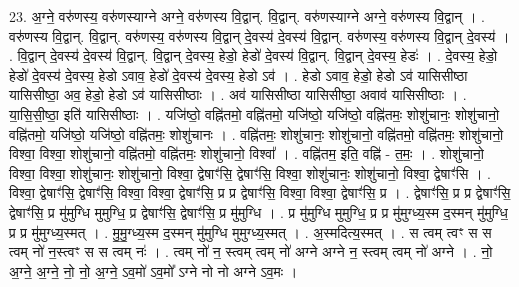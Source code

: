 \documentclass[17pt]{extarticle}
\begin{document}
23. अ॒ग्ने॒ वरु॑णस्य॒ वरु॑णस्याग्ने अग्ने॒ वरु॑णस्य वि॒द्वान्. वि॒द्वान्. वरु॑णस्याग्ने अग्ने॒ वरु॑णस्य वि॒द्वान् । . वरु॑णस्य वि॒द्वान्. वि॒द्वान्. वरु॑णस्य॒ वरु॑णस्य वि॒द्वान् दे॒वस्य॑ दे॒वस्य॑ वि॒द्वान्. वरु॑णस्य॒ वरु॑णस्य वि॒द्वान् दे॒वस्य॑ । . वि॒द्वान् दे॒वस्य॑ दे॒वस्य॑ वि॒द्वान्. वि॒द्वान् दे॒वस्य॒ हेडो॒ हेडो॑ दे॒वस्य॑ वि॒द्वान्. वि॒द्वान् दे॒वस्य॒ हेडः॑ । . दे॒वस्य॒ हेडो॒ हेडो॑ दे॒वस्य॑ दे॒वस्य॒ हेडो ऽवाव॒ हेडो॑ दे॒वस्य॑ दे॒वस्य॒ हेडो ऽव॑ । . हेडो ऽवाव॒ हेडो॒ हेडो ऽव॑ यासिसीष्ठा यासिसीष्ठा॒ अव॒ हेडो॒ हेडो ऽव॑ यासिसीष्ठाः । . अव॑ यासिसीष्ठा यासिसीष्ठा॒ अवाव॑ यासिसीष्ठाः । . या॒सि॒सी॒ष्ठा॒ इति॑ यासिसीष्ठाः । . यजि॑ष्ठो॒ वह्नि॑तमो॒ वह्नि॑तमो॒ यजि॑ष्ठो॒ यजि॑ष्ठो॒ वह्नि॑तमः॒ शोशु॑चानः॒ शोशु॑चानो॒ वह्नि॑तमो॒ यजि॑ष्ठो॒ यजि॑ष्ठो॒ वह्नि॑तमः॒ शोशु॑चानः । . वह्नि॑तमः॒ शोशु॑चानः॒ शोशु॑चानो॒ वह्नि॑तमो॒ वह्नि॑तमः॒ शोशु॑चानो॒ विश्वा॒ विश्वा॒ शोशु॑चानो॒ वह्नि॑तमो॒ वह्नि॑तमः॒ शोशु॑चानो॒ विश्वा᳚ । . वह्नि॑तम॒ इति॒ वह्नि॑ - त॒मः॒ । . शोशु॑चानो॒ विश्वा॒ विश्वा॒ शोशु॑चानः॒ शोशु॑चानो॒ विश्वा॒ द्वेषाꣳ॑सि॒ द्वेषाꣳ॑सि॒ विश्वा॒ शोशु॑चानः॒ शोशु॑चानो॒ विश्वा॒ द्वेषाꣳ॑सि । . विश्वा॒ द्वेषाꣳ॑सि॒ द्वेषाꣳ॑सि॒ विश्वा॒ विश्वा॒ द्वेषाꣳ॑सि॒ प्र प्र द्वेषाꣳ॑सि॒ विश्वा॒ विश्वा॒ द्वेषाꣳ॑सि॒ प्र । . द्वेषाꣳ॑सि॒ प्र प्र द्वेषाꣳ॑सि॒ द्वेषाꣳ॑सि॒ प्र मु॑मुग्धि मुमुग्धि॒ प्र द्वेषाꣳ॑सि॒ द्वेषाꣳ॑सि॒ प्र मु॑मुग्धि । . प्र मु॑मुग्धि मुमुग्धि॒ प्र प्र मु॑मुग्ध्य॒स्म द॒स्मन् मु॑मुग्धि॒ प्र प्र मु॑मुग्ध्य॒स्मत् । . मु॒मु॒ग्ध्य॒स्म द॒स्मन् मु॑मुग्धि मुमुग्ध्य॒स्मत् । . अ॒स्मदित्य॒स्मत् । . स त्वम् त्वꣳ स स त्वम् नो॑ न॒स्त्वꣳ स स त्वम् नः॑ । . त्वम् नो॑ न॒ स्त्वम् त्वम् नो॑ अग्ने अग्ने न॒ स्त्वम् त्वम् नो॑ अग्ने । . नो॒ अ॒ग्ने॒ अ॒ग्ने॒ नो॒ नो॒ अ॒ग्ने॒ ऽव॒मो॑ ऽव॒मो᳚ ऽग्ने नो नो अग्ने ऽव॒मः । \newline
\end{document}
